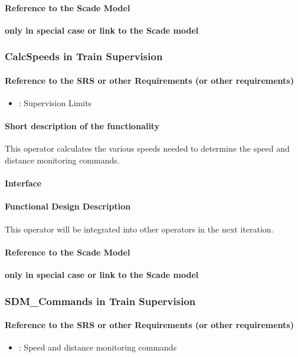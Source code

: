 \paragraph{Reference to the Scade Model}
\textbf{only in special case or link to the Scade model}

\subsubsection{CalcSpeeds in Train Supervision}
\paragraph{Reference to the SRS or other Requirements (or other requirements)}
\begin{itemize}
	\item \cite[Chapt.~3.13.9]{subset-026}: Supervision Limits 
\end{itemize}
\paragraph{Short description of the functionality}
This operator calculates the various speeds needed to determine the speed and distance monitoring commands.
\paragraph{Interface}
\paragraph{Functional Design Description}
This operator will be integrated into other operators in the next iteration.
\paragraph{Reference to the Scade Model}
\textbf{only in special case or link to the Scade model}

\subsubsection{SDM\_Commands in Train Supervision}
\paragraph{Reference to the SRS or other Requirements (or other requirements)}
\begin{itemize}
	\item \cite[Chapt.~3.13.10]{subset-026}: Speed and distance monitoring commands 
\end{itemize}
